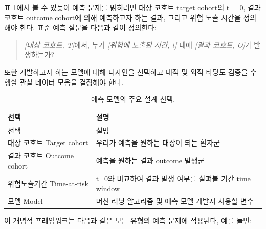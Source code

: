 \documentclass[10.5pt]{book}
\theoremstyle{definition}
\theoremstyle{definition}
\theoremstyle{definition}
\theoremstyle{remark}
\begin{document}
표 \ref{tab:plpDesign}에서 볼 수 있듯이 예측 문제를 밝히려면 대상 코호트
target cohort의 t = 0, 결과 코호트 outcome cohort에 의해 예측하고자 하는
결과, 그리고 위험 노출 시간을 정의해야 한다. 표준 예측 질문을 다음과
같이 정의한다:  

\begin{quote}
\emph{{[}대상 코호트, T{]}}에서, 누가 \emph{{[}위험에 노출된 시간, t{]}}
내에 \emph{{[}결과 코호트, O{]}}가 발생하는가?
\end{quote}

또한 개발하고자 하는 모델에 대해 디자인을 선택하고 내적 및 외적 타당도
검증을 수행할 관찰 데이터 모음을 결정해야 한다.

\begin{longtable}[]{@{}ll@{}}
\caption{\label{tab:plpDesign} 예측 모델의 주요 설계 선택.}\tabularnewline
\toprule
선택 & 설명\tabularnewline
\midrule
\endfirsthead
\toprule
선택 & 설명\tabularnewline
\midrule
\endhead
대상 코호트 Target cohort & 우리가 예측을 원하는 대상이 되는
환자군\tabularnewline
결과 코호트 Outcome cohort & 예측을 원하는 결과 outcome
발생군\tabularnewline
위험노출기간 Time-at-risk & t=0와 비교하여 결과 발생 여부를 살펴볼 기간
time window\tabularnewline
모델 Model & 머신 러닝 알고리즘 및 예측 모델 개발시 사용할
변수\tabularnewline
\bottomrule
\end{longtable}

이 개념적 프레임워크는 다음과 같은 모든 유형의 예측 문제에 적용된다,
예를 들면:
\end{document}
